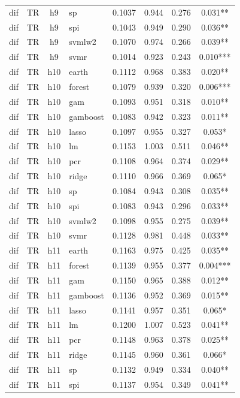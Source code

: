 \begin{ThreePartTable}
\begin{longtable}[t]{llclcccc}
dif & TR & h9 & sp & 0.1037 & 0.944 & 0.276 & 0.031**\\
dif & TR & h9 & spi & 0.1043 & 0.949 & 0.290 & 0.036**\\
dif & TR & h9 & svmlw2 & 0.1070 & 0.974 & 0.266 & 0.039**\\
dif & TR & h9 & svmr & 0.1014 & 0.923 & 0.243 & 0.010***\\
\addlinespace
dif & TR & h10 & earth & 0.1112 & 0.968 & 0.383 & 0.020**\\
dif & TR & h10 & forest & 0.1079 & 0.939 & 0.320 & 0.006***\\
dif & TR & h10 & gam & 0.1093 & 0.951 & 0.318 & 0.010**\\
dif & TR & h10 & gamboost & 0.1083 & 0.942 & 0.323 & 0.011**\\
dif & TR & h10 & lasso & 0.1097 & 0.955 & 0.327 & 0.053*\\
dif & TR & h10 & lm & 0.1153 & 1.003 & 0.511 & 0.046**\\
dif & TR & h10 & pcr & 0.1108 & 0.964 & 0.374 & 0.029**\\
dif & TR & h10 & ridge & 0.1110 & 0.966 & 0.369 & 0.065*\\
dif & TR & h10 & sp & 0.1084 & 0.943 & 0.308 & 0.035**\\
dif & TR & h10 & spi & 0.1083 & 0.943 & 0.296 & 0.033**\\
dif & TR & h10 & svmlw2 & 0.1098 & 0.955 & 0.275 & 0.039**\\
dif & TR & h10 & svmr & 0.1128 & 0.981 & 0.448 & 0.033**\\
\addlinespace
dif & TR & h11 & earth & 0.1163 & 0.975 & 0.425 & 0.035**\\
dif & TR & h11 & forest & 0.1139 & 0.955 & 0.377 & 0.004***\\
dif & TR & h11 & gam & 0.1150 & 0.965 & 0.388 & 0.012**\\
dif & TR & h11 & gamboost & 0.1136 & 0.952 & 0.369 & 0.015**\\
dif & TR & h11 & lasso & 0.1141 & 0.957 & 0.351 & 0.065*\\
dif & TR & h11 & lm & 0.1200 & 1.007 & 0.523 & 0.041**\\
dif & TR & h11 & pcr & 0.1148 & 0.963 & 0.378 & 0.025**\\
dif & TR & h11 & ridge & 0.1145 & 0.960 & 0.361 & 0.066*\\
dif & TR & h11 & sp & 0.1132 & 0.949 & 0.334 & 0.040**\\
dif & TR & h11 & spi & 0.1137 & 0.954 & 0.349 & 0.041**\\

\end{longtable}
\end{ThreePartTable}
